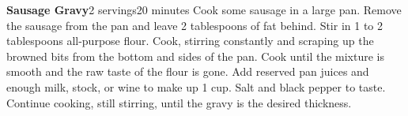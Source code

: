 \documentclass[../Cookbook.tex]{subfiles}
\begin{document}
\begin{recipe}[SausageGravy]{\textbf{Sausage Gravy}}{2 servings}{20 minutes}
	Cook some sausage in a large pan.
	Remove the sausage from the pan and leave 2 tablespoons of fat behind.
	Stir in 1 to 2 tablespoons all-purpose flour.
	Cook, stirring constantly and scraping up the browned bits from the bottom and sides of the pan.
	Cook until the mixture is smooth and the raw taste of the flour is gone.
	Add reserved pan juices and enough milk, stock, or wine to make up 1 cup.
	Salt and black pepper to taste.
	Continue cooking, still stirring, until the gravy is the desired thickness.
\end{recipe}
\end{document}
